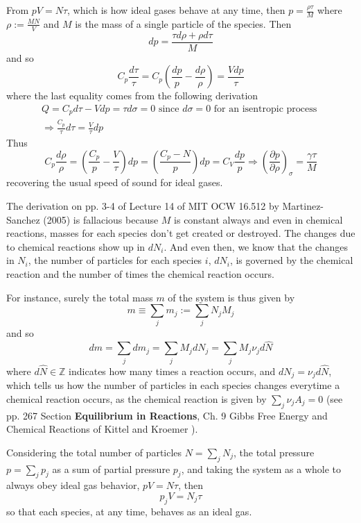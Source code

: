 \documentclass[10pt]{amsart}
\begin{document}
\begin{multicols*}{2}
From $pV=N\tau$, which is how ideal gases behave at any time, then $p = \frac{\rho \tau}{M}$ where $\rho := \frac{MN}{V}$ and $M$ is the mass of a single particle of the species.  Then
\[
dp = \frac{ \tau d\rho + \rho d\tau }{ M }
\]
and so
\[
C_p \frac{d\tau}{\tau} = C_p \left( \frac{dp}{p} - \frac{d\rho}{\rho} \right) = \frac{Vdp}{\tau}
\]
where the last equality comes from the following derivation
\[
\begin{gathered}
  Q = C_pd\tau - Vdp = \tau d\sigma = 0 \text{ since $d\sigma=0$ for an isentropic process } \\ 
  \Longrightarrow \frac{C_p }{\tau} d\tau = \frac{V}{\tau} dp
\end{gathered}
\]
Thus
\[
C_p \frac{d\rho}{\rho} = \left( \frac{C_p}{p} - \frac{V}{\tau} \right) dp = \left( \frac{C_p - N}{p} \right)dp = C_V \frac{dp}{p} \Longrightarrow \left( \frac{ \partial p}{ \partial \rho} \right)_{\sigma} = \frac{\gamma \tau}{M}
\]
recovering the usual speed of sound for ideal gases.  

The derivation on pp. 3-4 of Lecture 14 of MIT OCW 16.512 by Martinez-Sanchez (2005) \cite{MMartinez-Sanchez2005} is fallacious because $M$ is constant always and even in chemical reactions, masses for each species don't get created or destroyed.  The changes due to chemical reactions show up in $dN_i$.  And even then, we know that the changes in $N_i$, the number of particles for each species $i$, $dN_i$, is governed by the chemical reaction and the number of times the chemical reaction occurs.

For instance, surely the total mass $m$ of the system is thus given by
\[
m \equiv \sum_j m_j := \sum_j N_j M_j
\]
and so
\[
dm = \sum_j dm_j = \sum_j M_j dN_j = \sum_j M_j \nu_j d\widehat{N}
\]
where $d\widehat{N} \in \mathbb{Z}$ indicates how many times a reaction occurs, and $dN_j = \nu_j d\widehat{N}$, which tells us how the number of particles in each species changes everytime a chemical reaction occurs, as the chemical reaction is given by $\sum_j \nu_j A_j =0$ (see pp. 267 Section \textbf{Equilibrium in Reactions}, Ch. 9 Gibbs Free Energy and Chemical Reactions of Kittel and Kroemer \cite{CKittelHKroemer1980}).  

Considering the total number of particles $N = \sum_j N_j$, the total pressure $p = \sum_j p_j$ as a sum of partial pressure $p_j$, and taking the system as a whole to always obey ideal gas behavior, $pV=N\tau$, then
\[
p_j V= N_j \tau
\]
so that each species, at any time, behaves as an ideal gas. 


\end{multicols*}
\end{document}
